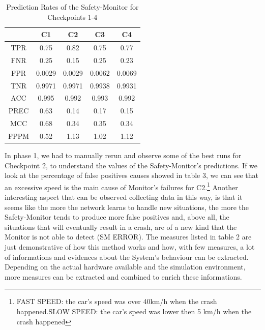 \begin{table}[h!]
	\begin{center}
		\begin{tabular}{ |c|c|c|c|c| }
			\hline
			& C1 & C2 & C3 & C4 \\
			\hline
			TPR & 0.75 & 0.82 & 0.75 & 0.77 \\
			\hline
			FNR & 0.25 & 0.15 & 0.25 & 0.23 \\
			\hline
			FPR & 0.0029 & 0.0029 & 0.0062 & 0.0069 \\
			\hline
			TNR & 0.9971 & 0.9971 & 0.9938 & 0.9931 \\
			\hline
			ACC & 0.995 & 0.992 & 0.993 & 0.992 \\
			\hline
			PREC & 0.63 & 0.14 & 0.17 & 0.15 \\
			\hline
			MCC & 0.68 & 0.34 & 0.35 & 0.34 \\
			\hline
			FPPM & 0.52 & 1.13 & 1.02 & 1.12 \\
			\hline
		\end{tabular}
		
		\caption{Prediction Rates of the Safety-Monitor for Checkpoints 1-4}
	\end{center}
\end{table}

In phase 1, we had to manually rerun and observe some of the best runs for Checkpoint 2, to understand the values of the Safety-Monitor's predictions. If we look at the percentage of false positives causes showed in table 3, we can see that an excessive speed is the main cause of Monitor's failures for C2.\footnote{FAST SPEED: the car's speed was over 40km/h when the crash happened.\newline SLOW SPEED: the car's speed was lower then 5 km/h when the crash happened}
Another interesting aspect that can be observed collecting data in this way, is that it seems like the more the network learns to handle new situations, the more the Safety-Monitor tends to produce more false positives and, above all, the situations that will eventually result in a crash, are of a new kind that the Monitor is not able to detect (SM ERROR).\newline
The measures listed in table 2 are just demonstrative of how this method works and how, with few measures, a lot of informations and evidences about the System's behaviour can be extracted. Depending on the actual hardware available and the simulation environment, more measures can be extracted and combined to enrich these informations.\newline

